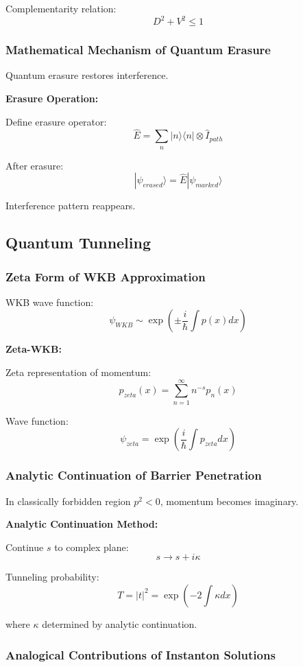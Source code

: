 \documentclass[11pt]{article}
\theoremstyle{plain}
\theoremstyle{definition}
\theoremstyle{remark}
\begin{document}
Complementarity relation:
$$D^2 + V^2 \leq 1$$

\subsubsection{Mathematical Mechanism of Quantum Erasure}

Quantum erasure restores interference.

\textbf{Erasure Operation:}

Define erasure operator:
$$\hat{E} = \sum_n |n\rangle\langle n| \otimes \hat{I}_{path}$$

After erasure:
$$|\psi_{erased}\rangle = \hat{E} |\psi_{marked}\rangle$$

Interference pattern reappears.

\subsection{Quantum Tunneling}

\subsubsection{Zeta Form of WKB Approximation}

WKB wave function:
$$\psi_{WKB} \sim \exp\left(\pm \frac{i}{\hbar} \int p(x) dx\right)$$

\textbf{Zeta-WKB:}

Zeta representation of momentum:
$$p_{zeta}(x) = \sum_{n=1}^{\infty} n^{-s} p_n(x)$$

Wave function:
$$\psi_{zeta} = \exp\left(\frac{i}{\hbar} \int p_{zeta} dx\right)$$

\subsubsection{Analytic Continuation of Barrier Penetration}

In classically forbidden region $p^2 < 0$, momentum becomes imaginary.

\textbf{Analytic Continuation Method:}

Continue $s$ to complex plane:
$$s \to s + i\kappa$$

Tunneling probability:
$$T = |t|^2 = \exp\left(-2\int \kappa dx\right)$$

where $\kappa$ determined by analytic continuation.

\subsubsection{Analogical Contributions of Instanton Solutions}
\end{document}
